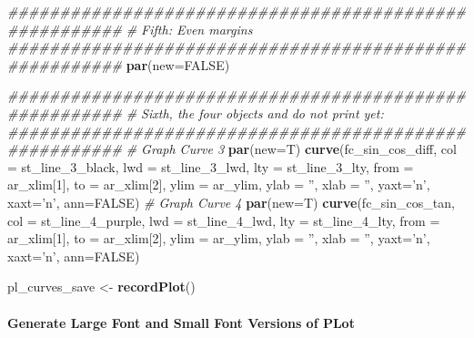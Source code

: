 \documentclass[
]{book}
\newenvironment{Shaded}{\begin{snugshade}}{\end{snugshade}}
\newcommand{\CommentTok}[1]{\textcolor[rgb]{0.56,0.35,0.01}{\textit{#1}}}
\newcommand{\DataTypeTok}[1]{\textcolor[rgb]{0.13,0.29,0.53}{#1}}
\newcommand{\DecValTok}[1]{\textcolor[rgb]{0.00,0.00,0.81}{#1}}
\newcommand{\KeywordTok}[1]{\textcolor[rgb]{0.13,0.29,0.53}{\textbf{#1}}}
\newcommand{\NormalTok}[1]{#1}
\newcommand{\OtherTok}[1]{\textcolor[rgb]{0.56,0.35,0.01}{#1}}
\newcommand{\StringTok}[1]{\textcolor[rgb]{0.31,0.60,0.02}{#1}}
\begin{document}
\begin{Shaded}
\begin{Highlighting}[]
\CommentTok{#######################################################}
\CommentTok{# Fifth: Even margins}
\CommentTok{#######################################################}
\KeywordTok{par}\NormalTok{(}\DataTypeTok{new=}\OtherTok{FALSE}\NormalTok{)}

\CommentTok{#######################################################}
\CommentTok{# Sixth, the four objects and do not print yet:}
\CommentTok{#######################################################}
\CommentTok{# Graph Curve 3}
\KeywordTok{par}\NormalTok{(}\DataTypeTok{new=}\NormalTok{T)}
\KeywordTok{curve}\NormalTok{(fc_sin_cos_diff,}
      \DataTypeTok{col =}\NormalTok{ st_line_}\DecValTok{3}\NormalTok{_black,}
      \DataTypeTok{lwd =}\NormalTok{ st_line_}\DecValTok{3}\NormalTok{_lwd, }\DataTypeTok{lty =}\NormalTok{ st_line_}\DecValTok{3}\NormalTok{_lty,}
      \DataTypeTok{from =}\NormalTok{ ar_xlim[}\DecValTok{1}\NormalTok{], }\DataTypeTok{to =}\NormalTok{ ar_xlim[}\DecValTok{2}\NormalTok{], }\DataTypeTok{ylim =}\NormalTok{ ar_ylim,}
      \DataTypeTok{ylab =} \StringTok{''}\NormalTok{, }\DataTypeTok{xlab =} \StringTok{''}\NormalTok{, }\DataTypeTok{yaxt=}\StringTok{'n'}\NormalTok{, }\DataTypeTok{xaxt=}\StringTok{'n'}\NormalTok{, }\DataTypeTok{ann=}\OtherTok{FALSE}\NormalTok{)}
\CommentTok{# Graph Curve 4}
\KeywordTok{par}\NormalTok{(}\DataTypeTok{new=}\NormalTok{T)}
\KeywordTok{curve}\NormalTok{(fc_sin_cos_tan,}
      \DataTypeTok{col =}\NormalTok{ st_line_}\DecValTok{4}\NormalTok{_purple,}
      \DataTypeTok{lwd =}\NormalTok{ st_line_}\DecValTok{4}\NormalTok{_lwd, }\DataTypeTok{lty =}\NormalTok{ st_line_}\DecValTok{4}\NormalTok{_lty,}
      \DataTypeTok{from =}\NormalTok{ ar_xlim[}\DecValTok{1}\NormalTok{], }\DataTypeTok{to =}\NormalTok{ ar_xlim[}\DecValTok{2}\NormalTok{], }\DataTypeTok{ylim =}\NormalTok{ ar_ylim,}
      \DataTypeTok{ylab =} \StringTok{''}\NormalTok{, }\DataTypeTok{xlab =} \StringTok{''}\NormalTok{, }\DataTypeTok{yaxt=}\StringTok{'n'}\NormalTok{, }\DataTypeTok{xaxt=}\StringTok{'n'}\NormalTok{, }\DataTypeTok{ann=}\OtherTok{FALSE}\NormalTok{)}
\end{Highlighting}
\end{Shaded}

\begin{Shaded}
\begin{Highlighting}[]
\NormalTok{pl_curves_save <-}\StringTok{ }\KeywordTok{recordPlot}\NormalTok{()}
\end{Highlighting}
\end{Shaded}

\hypertarget{generate-large-font-and-small-font-versions-of-plot}{%
\paragraph{Generate Large Font and Small Font Versions of PLot}\label{generate-large-font-and-small-font-versions-of-plot}}
\end{document}
